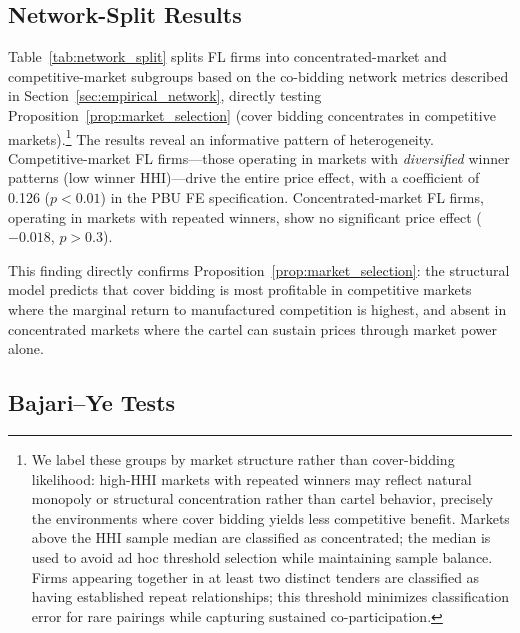 


\subsection{Network-Split Results}
\label{sec:results_network}

Table~\ref{tab:network_split} splits FL firms into
concentrated-market and competitive-market subgroups based on the
co-bidding network metrics described in
Section~\ref{sec:empirical_network}, directly testing
Proposition~\ref{prop:market_selection} (cover bidding concentrates in
competitive markets).\footnote{We label these groups by
market structure rather than cover-bidding likelihood: high-HHI markets
with repeated winners may reflect natural monopoly or structural
concentration rather than cartel behavior, precisely the environments
where cover bidding yields less competitive benefit.
Markets above the HHI sample median are classified as concentrated;
the median is used to avoid ad hoc threshold selection while maintaining
sample balance. Firms appearing together in at least two distinct
tenders are classified as having established repeat relationships;
this threshold minimizes classification error for rare pairings while
capturing sustained co-participation.}
The results reveal an informative pattern of heterogeneity.
Competitive-market FL firms---those operating in markets with
\emph{diversified} winner patterns (low winner HHI)---drive the entire
price effect, with a coefficient of 0.126 ($p < 0.01$) in the PBU FE
specification. Concentrated-market FL firms, operating in markets with
repeated winners, show no significant price effect ($-0.018$, $p > 0.3$).

This finding directly confirms Proposition~\ref{prop:market_selection}:
the structural model predicts that cover bidding is most profitable in
competitive markets where the marginal return to manufactured
competition is highest, and absent in concentrated markets where the
cartel can sustain prices through market power alone.




\subsection{Bajari--Ye Tests}
\label{sec:results_bajari}

